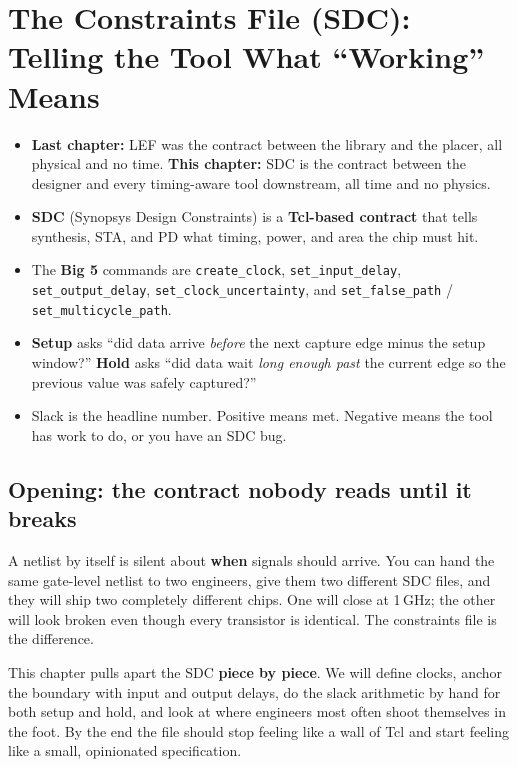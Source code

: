 \chapter[The Constraints File (SDC)]{The Constraints File (SDC): Telling the Tool What ``Working'' Means}

\begin{tldr}
\begin{itemize}
  \item \textbf{Last chapter:} LEF was the contract between the library and the placer, all physical and no time. \textbf{This chapter:} SDC is the contract between the designer and every timing-aware tool downstream, all time and no physics.
  \item \textbf{SDC} (Synopsys Design Constraints) is a \textbf{Tcl-based contract} that tells synthesis, STA, and PD what timing, power, and area the chip must hit.
  \item The \textbf{Big 5} commands are \texttt{create\_clock}, \texttt{set\_input\_delay}, \texttt{set\_output\_delay}, \texttt{set\_clock\_uncertainty}, and \texttt{set\_false\_path} / \texttt{set\_multicycle\_path}.
  \item \textbf{Setup} asks ``did data arrive \emph{before} the next capture edge minus the setup window?'' \textbf{Hold} asks ``did data wait \emph{long enough past} the current edge so the previous value was safely captured?''
  \item Slack is the headline number. Positive means met. Negative means the tool has work to do, or you have an SDC bug.
\end{itemize}
\end{tldr}

\section*{Opening: the contract nobody reads until it breaks}

A netlist by itself is silent about \textbf{when} signals should arrive. You can hand the same gate-level netlist to two engineers, give them two different SDC files, and they will ship two completely different chips. One will close at 1\,GHz; the other will look broken even though every transistor is identical. The constraints file is the difference.

This chapter pulls apart the SDC \textbf{piece by piece}. We will define clocks, anchor the boundary with input and output delays, do the slack arithmetic by hand for both setup and hold, and look at where engineers most often shoot themselves in the foot. By the end the file should stop feeling like a wall of Tcl and start feeling like a small, opinionated specification.

